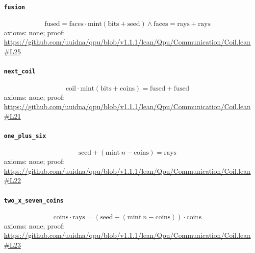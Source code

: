 \documentclass[11pt]{article}
\begin{document}
\paragraph{\texttt{fusion}}
\[ \mathrm{fused} = \mathrm{faces} \cdot \mathrm{mint} (\mathrm{bits} + \mathrm{seed}) \land \mathrm{faces} = \mathrm{rays} + \mathrm{rays} \]
\noindent axioms: none; proof: \url{https://github.com/uuidna/qpu/blob/v1.1.1/lean/Qpu/Communication/Coil.lean\#L25}

\paragraph{\texttt{next\_coil}}
\[ \mathrm{coil} \cdot \mathrm{mint} (\mathrm{bits} + \mathrm{coins}) = \mathrm{fused} + \mathrm{fused} \]
\noindent axioms: none; proof: \url{https://github.com/uuidna/qpu/blob/v1.1.1/lean/Qpu/Communication/Coil.lean\#L21}

\paragraph{\texttt{one\_plus\_six}}
\[ \mathrm{seed} + (\mathrm{mint}\ n - \mathrm{coins}) = \mathrm{rays} \]
\noindent axioms: none; proof: \url{https://github.com/uuidna/qpu/blob/v1.1.1/lean/Qpu/Communication/Coil.lean\#L22}

\paragraph{\texttt{two\_x\_seven\_coins}}
\[ \mathrm{coins} \cdot \mathrm{rays} = (\mathrm{seed} + (\mathrm{mint}\ n - \mathrm{coins})) \cdot \mathrm{coins} \]
\noindent axioms: none; proof: \url{https://github.com/uuidna/qpu/blob/v1.1.1/lean/Qpu/Communication/Coil.lean\#L23}
\end{document}
